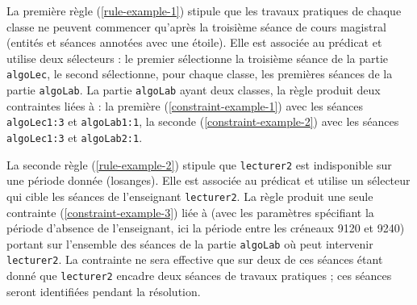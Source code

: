 La première règle (\ref{rule-example-1}) %
stipule que les travaux pratiques de chaque classe ne peuvent commencer qu'après la troisième séance de cours magistral (entités et séances annotées avec une étoile).
Elle est associée au prédicat \texttt{\SEQUENCED} et utilise deux sélecteurs : le premier sélectionne la troisième séance de la partie \texttt{algoLec}, le second sélectionne, pour chaque classe, les premières séances de la partie \texttt{algoLab}.
La partie \texttt{algoLab} ayant deux classes, la règle produit deux contraintes liées à \texttt{\SEQUENCED} : la première (\ref{constraint-example-1}) avec les séances \texttt{algoLec1:3} et \texttt{algoLab1:1}, la seconde (\ref{constraint-example-2}) avec les séances \texttt{algoLec1:3} et \texttt{algoLab2:1}.

La seconde règle (\ref{rule-example-2}) stipule que \texttt{lecturer2} est indisponible sur une période donnée (losanges).
Elle est associée au prédicat \texttt{\FORBIDDENPERIOD} et utilise un sélecteur qui cible les séances de l'enseignant \texttt{lecturer2}.
La règle produit une seule contrainte (\ref{constraint-example-3}) liée à \texttt{\FORBIDDENPERIOD} (avec les paramètres spécifiant la période d'absence de l'enseignant, ici la période entre les créneaux 9120 et 9240) portant sur l'ensemble des séances de la partie \texttt{algoLab} où peut intervenir \texttt{lecturer2}.
La contrainte ne sera effective que sur deux de ces séances étant donné que \texttt{lecturer2} encadre deux séances de travaux pratiques ; ces séances seront identifiées pendant la résolution.




